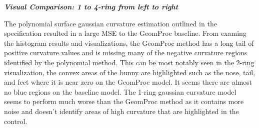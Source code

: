 \documentclass{article}
\renewcommand{\i}[1]{\textit{{#1}}}
\renewcommand{\b}[1]{\textbf{{#1}}}
\begin{document}
\begin{center}
\b{\i{Visual Comparison: 1 to 4-ring from left to right}}
\end{center}
\smallbreak
{}

The polynomial surface gaussian curvature estimation outlined in the
specification resulted in a large MSE to the GeomProc baseline. From examing the
histogram results and visualizations, the GeomProc method has a long tail of positive curvature
values and is missing many of the negative curvature regions identified by the
polynomial method. This can be most notably seen in the 2-ring visualization,
the convex areas of the bunny are highlighted such as the nose, tail, and feet
where it is near zero on the GeomProc model. It seems there are almost no blue
regions on the baseline model. The 1-ring gaussian curvature model
seems to perform much worse than the GeomProc method as it contains more noise and doesn't
identify areas of high curvature that are highlighted in the control.
\pagebreak
\end{document}

